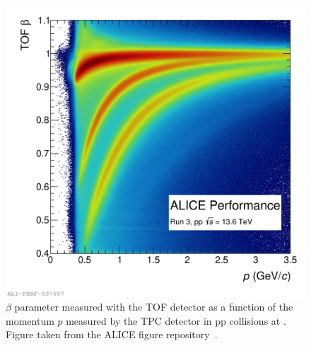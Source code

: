 \begin{figure}[htb]
    \centering
    \includegraphics[width=0.7\linewidth]{Figures/Chapter 4/toflhc22q_pass3_0.png}
    \caption{$\beta$ parameter measured with the TOF detector as a function of the momentum $p$ measured by the TPC detector in pp collisions at \thirteen. Figure taken from the ALICE figure repository~\cite{ALICE_figures}.}
    \label{fig:TOFPID}
\end{figure}


